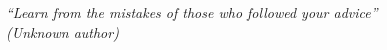 


\vspace*{\fill}
\begin{flushright}
	\textit{``Learn from the mistakes of those who followed your advice'' \\ (Unknown author)}
\end{flushright}

